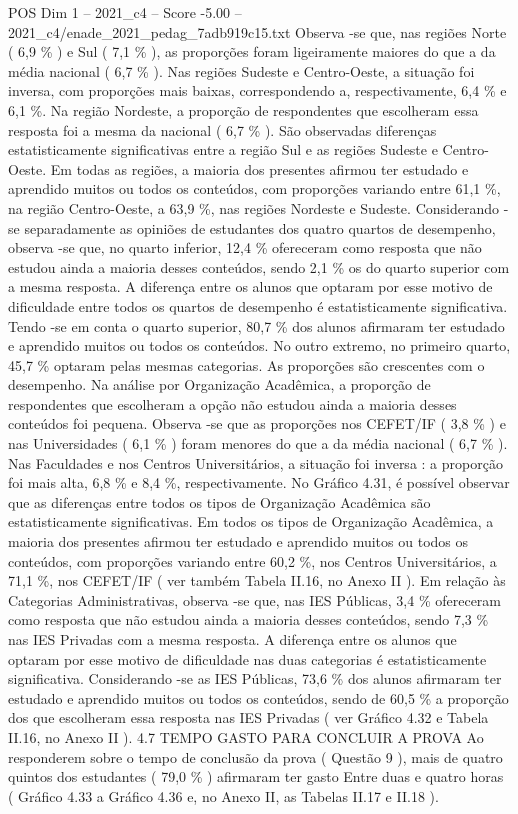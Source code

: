 \begin{textsample}{POS Dim 1 – 2021\_c4 – Score -5.00 – 2021\_c4/enade\_2021\_pedag\_7adb919c15.txt}
Observa -se que, nas regiões Norte ( 6,9 \% ) e Sul ( 7,1 \% ), as proporções foram ligeiramente maiores do que a da média nacional ( 6,7 \% ).
Nas regiões Sudeste e Centro-Oeste, a situação foi inversa, com proporções mais baixas, correspondendo a, respectivamente, 6,4 \% e 6,1 \%.
Na região Nordeste, a proporção de respondentes que escolheram essa resposta foi a mesma da nacional ( 6,7 \% ).
São observadas diferenças estatisticamente significativas entre a região Sul e as regiões Sudeste e Centro-Oeste.
Em todas as regiões, a maioria dos presentes afirmou ter estudado e aprendido muitos ou todos os conteúdos, com proporções variando entre 61,1 \%, na região Centro-Oeste, a 63,9 \%, nas regiões Nordeste e Sudeste.
Considerando -se separadamente as opiniões de estudantes dos quatro quartos de desempenho, observa -se que, no quarto inferior, 12,4 \% ofereceram como resposta que não estudou ainda a maioria desses conteúdos, sendo 2,1 \% os do quarto superior com a mesma resposta.
A diferença entre os alunos que optaram por esse motivo de dificuldade entre todos os quartos de desempenho é estatisticamente significativa.
Tendo -se em conta o quarto superior, 80,7 \% dos alunos afirmaram ter estudado e aprendido muitos ou todos os conteúdos.
No outro extremo, no primeiro quarto, 45,7 \% optaram pelas mesmas categorias.
As proporções são crescentes com o desempenho.
Na análise por Organização Acadêmica, a proporção de respondentes que escolheram a opção não estudou ainda a maioria desses conteúdos foi pequena.
Observa -se que as proporções nos CEFET/IF ( 3,8 \% ) e nas Universidades ( 6,1 \% ) foram menores do que a da média nacional ( 6,7 \% ).
Nas Faculdades e nos Centros Universitários, a situação foi inversa : a proporção foi mais alta, 6,8 \% e 8,4 \%, respectivamente.
No Gráfico 4.31, é possível observar que as diferenças entre todos os tipos de Organização Acadêmica são estatisticamente significativas.
Em todos os tipos de Organização Acadêmica, a maioria dos presentes afirmou ter estudado e aprendido muitos ou todos os conteúdos, com proporções variando entre 60,2 \%, nos Centros Universitários, a 71,1 \%, nos CEFET/IF ( ver também Tabela II.16, no Anexo II ).
Em relação às Categorias Administrativas, observa -se que, nas IES Públicas, 3,4 \% ofereceram como resposta que não estudou ainda a maioria desses conteúdos, sendo 7,3 \% nas IES Privadas com a mesma resposta.
A diferença entre os alunos que optaram por esse motivo de dificuldade nas duas categorias é estatisticamente significativa.
Considerando -se as IES Públicas, 73,6 \% dos alunos afirmaram ter estudado e aprendido muitos ou todos os conteúdos, sendo de 60,5 \% a proporção dos que escolheram essa resposta nas IES Privadas ( ver Gráfico 4.32 e Tabela II.16, no Anexo II ). 4.7 TEMPO GASTO PARA CONCLUIR A PROVA Ao responderem sobre o tempo de conclusão da prova ( Questão 9 ), mais de quatro quintos dos estudantes ( 79,0 \% ) afirmaram ter gasto Entre duas e quatro horas ( Gráfico 4.33 a Gráfico 4.36 e, no Anexo II, as Tabelas II.17 e II.18 ).

\end{textsample}
